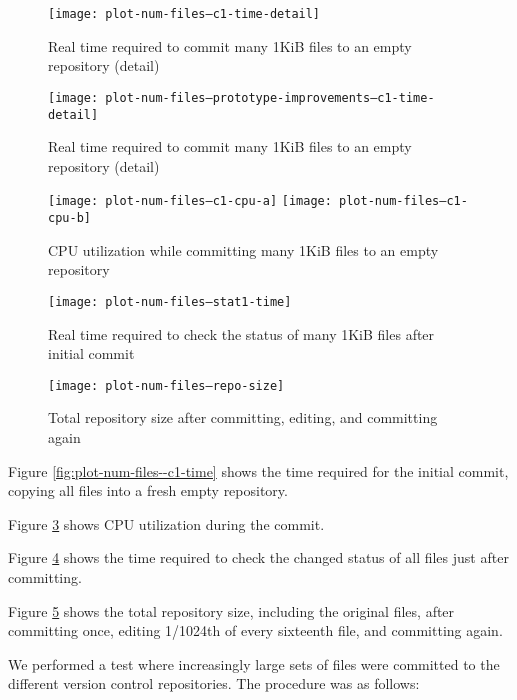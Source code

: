 \documentclass[12pt,a4paper,two-side]{book}
\begin{document}
\begin{figure}[p]
  \caption{Real time required to commit many 1KiB files to an empty repository
  (detail)}
  \label{fig:plot-num-files--c1-time-detail}
  \centering
    \texttt{[image: plot-num-files--c1-time-detail]}
\end{figure}

\begin{figure}[p]
  \caption{Real time required to commit many 1KiB files to an empty repository
  (detail)}
  \label{fig:plot-num-files--prototype-improvements--c1-time-detail}
  \centering
    \texttt{[image: plot-num-files--prototype-improvements--c1-time-detail]}
\end{figure}

\begin{figure}[p]
  \caption{CPU utilization while committing many 1KiB files to an empty
  repository}
  \label{fig:plot-num-files--c1-cpu}
  \centering
    \texttt{[image: plot-num-files--c1-cpu-a]}
    \texttt{[image: plot-num-files--c1-cpu-b]}
\end{figure}

\begin{figure}[p]
  \caption{Real time required to check the status of many 1KiB files after
  initial commit}
  \label{fig:plot-num-files--stat1-time}
  \centering
    \texttt{[image: plot-num-files--stat1-time]}
\end{figure}

\begin{figure}[p]
  \caption{Total repository size after committing, editing, and committing again}
  \label{fig:plot-num-files--repo-size}
  \centering
    \texttt{[image: plot-num-files--repo-size]}
\end{figure}

Figure \ref{fig:plot-num-files--c1-time} shows the time
required for the initial commit, copying all files into a fresh empty
repository.

Figure \ref{fig:plot-num-files--c1-cpu} shows CPU utilization
during the commit.

Figure \ref{fig:plot-num-files--stat1-time} shows the time
required to check the changed status of all files just after committing.

Figure \ref{fig:plot-num-files--repo-size} shows the total
repository size, including the original files, after committing once, editing
1/1024th of every sixteenth file, and committing again.


\iffalse

We performed a test where increasingly large sets of files were committed to the
different version control repositories. The procedure was as follows:
\end{document}
